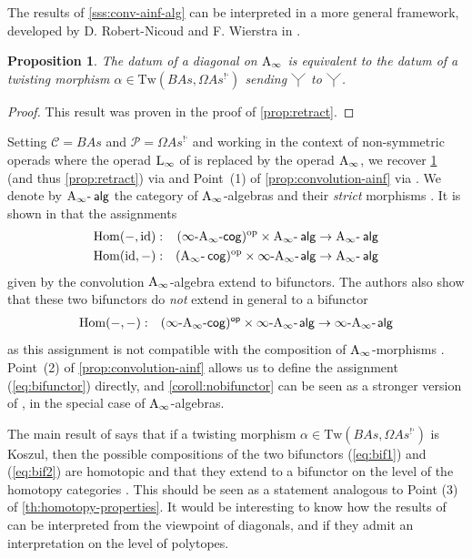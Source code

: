 \documentclass[10pt]{amsart}
\newtheorem{proposition}[definition]{Proposition}
\theoremstyle{remark}
\begin{document}
The results of \cref{sss:conv-ainf-alg} can be interpreted in a more general framework, developed by D. Robert-Nicoud and F. Wierstra in \cite{RobertNicoudWierstraI,RobertNicoudWierstraII}. 

\begin{proposition}
  \label{coroll:twisting}
  The datum of a diagonal on $\mathrm{A}_\infty$ is equivalent to the datum of a twisting morphism $\alpha \in \mathrm{Tw}(B As,\Omega As^{\text{!`}})$ sending $\premiertermecobarbarA$ to $\premiertermecobarbarA$. 
\end{proposition}

\begin{proof}
This result was proven in the proof of \cref{prop:retract}.
\end{proof}

Setting $\mathcal{C}=B As$ and $\mathcal{P}=\Omega As^{\text{!`}}$ and working in the context of non-symmetric operads where the operad $\mathrm{L}_\infty$ of \cite{RobertNicoudWierstraI,RobertNicoudWierstraII} is replaced by the operad $\mathrm{A}_\infty$, we recover \cref{coroll:twisting} (and thus \cref{prop:retract}) via \cite[Theorem 7.1]{RobertNicoudWierstraI} and Point~(1) of \cref{prop:convolution-ainf} via \cite[Theorem 4.1]{RobertNicoudWierstraI}.
We denote by $\mathrm{A}_\infty\text{-\hspace{2pt}}\mathsf{alg}$ the category of $\mathrm{A}_\infty$-algebras and their \emph{strict} morphisms \cite[Section 10.2.1]{LodayVallette12}.
It is shown in \cite[Corollary 5.4]{RobertNicoudWierstraI} that the assignments
\begin{eqnarray}
  \mathrm{Hom}(-,\mathrm{id}) &:& (\infty\text{-}\mathrm{A}_\infty\text{-}\mathsf{cog})^{\mathrm{op}} \times \mathrm{A}_\infty\text{-\hspace{2pt}}\mathsf{alg} \to \mathrm{A}_\infty\text{-\hspace{2pt}}\mathsf{alg} \label{eq:bif1} \\
  \mathrm{Hom}(\mathrm{id}, -) &:& (\mathrm{A}_\infty\text{-\hspace{2pt}}\mathsf{cog})^{\mathrm{op}} \times \infty\text{-}\mathrm{A}_\infty\text{-\hspace{1pt}}\mathsf{alg} \to \mathrm{A}_\infty\text{-\hspace{2pt}}\mathsf{alg} \label{eq:bif2}
\end{eqnarray}
given by the convolution $\mathrm{A}_\infty$-algebra extend to bifunctors. 
The authors also show that these two bifunctors do \emph{not} extend in general to a bifunctor 
\begin{eqnarray}
  \mathrm{Hom}(-,-) &:& \mathsf{(\infty\text{-}\mathrm{A}_\infty\text{-}\mathsf{cog})^{op}} \times \infty\text{-}\mathrm{A}_\infty\text{-\hspace{1pt}}\mathsf{alg} \to \infty\text{-}\mathrm{A}_\infty\text{-\hspace{1pt}}\mathsf{alg} \label{eq:bifunctor}
\end{eqnarray}
as this assignment is not compatible with the composition of $\mathrm{A}_\infty$-morphisms \cite[Theorem 6.6]{RobertNicoudWierstraI}.
Point~(2) of \cref{prop:convolution-ainf} allows us to define the assignment (\ref{eq:bifunctor}) directly, and \cref{coroll:nobifunctor} can be seen as a stronger version of \cite[Theorem 6.6]{RobertNicoudWierstraI}, in the special case of $\mathrm{A}_\infty$-algebras. 

The main result of \cite{RobertNicoudWierstraII} says that if a twisting morphism $\alpha \in \mathrm{Tw}(B As,\Omega As^{\text{!`}})$ is Koszul, then the possible compositions of the two bifunctors (\ref{eq:bif1}) and (\ref{eq:bif2}) are homotopic and that they extend to a bifunctor on the level of the homotopy categories \cite[Theorem 3.6 and Corollary 3.8]{RobertNicoudWierstraII}. 
This should be seen as a statement analogous to Point (3) of \cref{th:homotopy-properties}. It would be interesting to know how the results of \cite{RobertNicoudWierstraI,RobertNicoudWierstraII} can be interpreted from the viewpoint of diagonals, and if they admit an interpretation on the level of polytopes.
\end{document}
